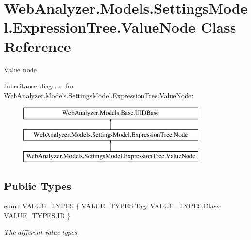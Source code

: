 \hypertarget{class_web_analyzer_1_1_models_1_1_settings_model_1_1_expression_tree_1_1_value_node}{}\section{Web\+Analyzer.\+Models.\+Settings\+Model.\+Expression\+Tree.\+Value\+Node Class Reference}
\label{class_web_analyzer_1_1_models_1_1_settings_model_1_1_expression_tree_1_1_value_node}


Value node  


Inheritance diagram for Web\+Analyzer.\+Models.\+Settings\+Model.\+Expression\+Tree.\+Value\+Node\+:\begin{figure}[H]
\begin{center}
\leavevmode
\includegraphics[height=3.000000cm]{class_web_analyzer_1_1_models_1_1_settings_model_1_1_expression_tree_1_1_value_node}
\end{center}
\end{figure}
\subsection*{Public Types}
\begin{DoxyCompactItemize}
\item 
enum \hyperlink{class_web_analyzer_1_1_models_1_1_settings_model_1_1_expression_tree_1_1_value_node_ac18254d82bd6e0d754ed1a2484882d11}{V\+A\+L\+U\+E\+\_\+\+T\+Y\+P\+E\+S} \{ \hyperlink{class_web_analyzer_1_1_models_1_1_settings_model_1_1_expression_tree_1_1_value_node_ac18254d82bd6e0d754ed1a2484882d11ac101058e7ea21bbbf2a5ac893088e90b}{V\+A\+L\+U\+E\+\_\+\+T\+Y\+P\+E\+S.\+Tag}, 
\hyperlink{class_web_analyzer_1_1_models_1_1_settings_model_1_1_expression_tree_1_1_value_node_ac18254d82bd6e0d754ed1a2484882d11a9bd81329febf6efe22788e03ddeaf0af}{V\+A\+L\+U\+E\+\_\+\+T\+Y\+P\+E\+S.\+Class}, 
\hyperlink{class_web_analyzer_1_1_models_1_1_settings_model_1_1_expression_tree_1_1_value_node_ac18254d82bd6e0d754ed1a2484882d11ab718adec73e04ce3ec720dd11a06a308}{V\+A\+L\+U\+E\+\_\+\+T\+Y\+P\+E\+S.\+I\+D}
 \}\begin{DoxyCompactList}\small\item\em The different value types. \end{DoxyCompactList}
\end{DoxyCompactItemize}
